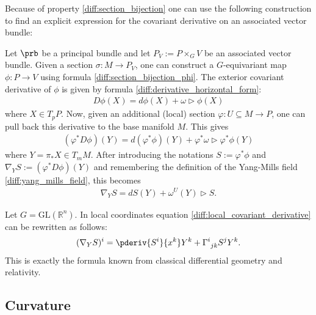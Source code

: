     Because of property \ref{diff:section_bijection} one can use the following construction to find an explicit expression for the covariant derivative on an associated vector bundle:
    \begin{construct}\label{diff:covariant_derivative_associated_bundle}
        Let $\prb$ be a principal bundle and let $P_V := P\times_G V$ be an associated vector bundle. Given a section $\sigma:M\rightarrow P_V$, one can construct a $G$-equivariant map $\phi:P\rightarrow V$ using formula \ref{diff:section_bijection_phi}. The exterior covariant derivative of $\phi$ is given by formula \ref{diff:derivative_horizontal_form}:
        \begin{gather}
            D\phi(X) = d\phi(X) + \omega\triangleright\phi(X)
        \end{gather}
        where $X\in T_pP$. Now, given an additional (local) section $\varphi:U\subseteq M\rightarrow P$, one can pull back this derivative to the base manifold $M$. This gives
        \begin{gather}
            (\varphi^*D\phi)(Y) = d(\varphi^*\phi)(Y) + \varphi^*\omega\triangleright\varphi^*\phi(Y)
        \end{gather}
        where $Y=\pi_*X\in T_mM$. After introducing the notations $S:=\varphi^*\phi$ and $\nabla_YS:=(\varphi^*D\phi)(Y)$ and remembering the definition of the Yang-Mills field \ref{diff:yang_mills_field}, this becomes
        \begin{gather}
            \label{diff:local_covariant_derivative}
            \nabla_YS = dS(Y) + \omega^U(Y)\triangleright S.
        \end{gather}
    \end{construct}
    \begin{example}
        Let $G=\text{GL}(\mathbb{R}^n)$. In local coordinates equation \ref{diff:local_covariant_derivative} can be rewritten as follows:
        \begin{gather}
            (\nabla_YS)^i = \pderiv{S^i}{x^k}Y^k + \Gamma^i_{\ jk}S^jY^k.
        \end{gather}
        This is exactly the formula known from classical differential geometry and relativity.
    \end{example}

\subsection{Curvature}

